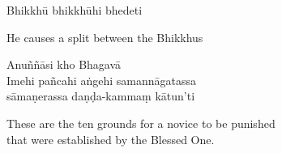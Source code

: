 Bhikkhū bhikkhūhi bhedeti

\begin{english}
  He causes a split between the Bhikkhus
\end{english}

Anuññāsi kho Bhagavā\\
Imehi pañcahi aṅgehi samannāgatassa\\
sāmaṇerassa daṇḍa-kammaṃ kātun'ti

\begin{english}
  These are the ten grounds for a novice to be punished\\
  that were established by the Blessed One.
\end{english}


